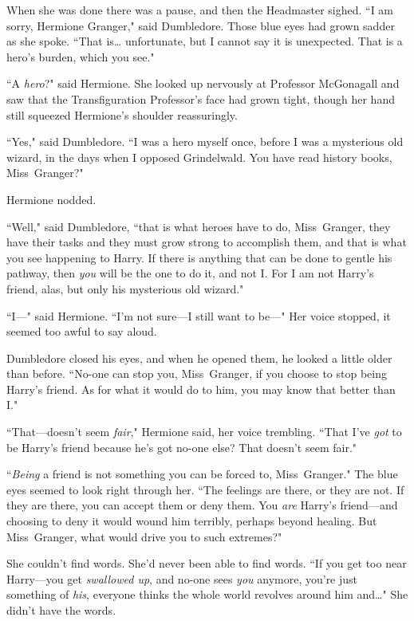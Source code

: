 When she was done there was a pause, and then the Headmaster sighed. ``I am sorry, Hermione Granger," said Dumbledore. Those blue eyes had grown sadder as she spoke. ``That is{\ldots} unfortunate, but I cannot say it is unexpected. That is a hero's burden, which you see."

``A \emph{hero}?" said Hermione. She looked up nervously at Professor McGonagall and saw that the Transfiguration Professor's face had grown tight, though her hand still squeezed Hermione's shoulder reassuringly.

``Yes," said Dumbledore. ``I was a hero myself once, before I was a mysterious old wizard, in the days when I opposed Grindelwald. You have read history books, Miss~Granger?"

Hermione nodded.

``Well," said Dumbledore, ``that is what heroes have to do, Miss~Granger, they have their tasks and they must grow strong to accomplish them, and that is what you see happening to Harry. If there is anything that can be done to gentle his pathway, then \emph{you} will be the one to do it, and not I\@. For I am not Harry's friend, alas, but only his mysterious old wizard."

``I—" said Hermione. ``I'm not sure—I still want to be—" Her voice stopped, it seemed too awful to say aloud.

Dumbledore closed his eyes, and when he opened them, he looked a little older than before. ``No-one can stop you, Miss~Granger, if you choose to stop being Harry's friend. As for what it would do to him, you may know that better than I."

``That—doesn't seem \emph{fair}," Hermione said, her voice trembling. ``That I've \emph{got} to be Harry's friend because he's got no-one else? That doesn't seem fair."

``\emph{Being} a friend is not something you can be forced to, Miss~Granger." The blue eyes seemed to look right through her. ``The feelings are there, or they are not. If they are there, you can accept them or deny them. You \emph{are} Harry's friend—and choosing to deny it would wound him terribly, perhaps beyond healing. But Miss~Granger, what would drive you to such extremes?"

She couldn't find words. She'd never been able to find words. ``If you get too near Harry—you get \emph{swallowed up}, and no-one sees \emph{you} anymore, you're just something of \emph{his}, everyone thinks the whole world revolves around him and{\ldots}" She didn't have the words.

